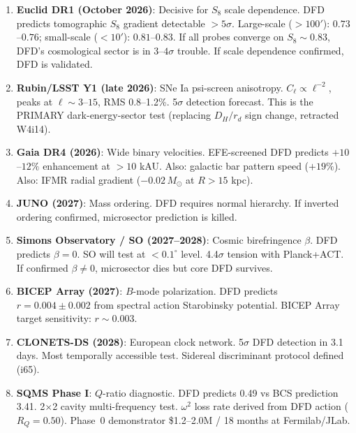 \documentclass[11pt,a4paper]{article}
\begin{document}
\begin{enumerate}
\item \textbf{Euclid DR1 (October 2026)}: Decisive for $S_8$ scale dependence. DFD predicts tomographic $S_8$ gradient detectable $>5\sigma$. Large-scale (${>}100'$): $0.73$--$0.76$; small-scale (${<}10'$): $0.81$--$0.83$. If all probes converge on $S_8 \sim 0.83$, DFD's cosmological sector is in $3$--$4\sigma$ trouble. If scale dependence confirmed, DFD is validated.

\item \textbf{Rubin/LSST Y1 (late 2026)}: SNe Ia psi-screen anisotropy. $C_\ell \propto \ell^{-2}$, peaks at $\ell \sim 3$--$15$, RMS 0.8--1.2\%. 5$\sigma$ detection forecast. This is the PRIMARY dark-energy-sector test (replacing $D_H/r_d$ sign change, retracted W4i14).

\item \textbf{Gaia DR4 (2026)}: Wide binary velocities. EFE-screened DFD predicts $+10$--$12\%$ enhancement at $>10$ kAU. Also: galactic bar pattern speed ($+19\%$). Also: IFMR radial gradient ($-0.02\,M_\odot$ at $R > 15$ kpc).

\item \textbf{JUNO (2027)}: Mass ordering. DFD requires normal hierarchy. If inverted ordering confirmed, microsector prediction is killed.

\item \textbf{Simons Observatory / SO (2027--2028)}: Cosmic birefringence $\beta$. DFD predicts $\beta = 0$. SO will test at $< 0.1^\circ$ level. 4.4$\sigma$ tension with Planck+ACT. If confirmed $\beta \neq 0$, microsector dies but core DFD survives.

\item \textbf{BICEP Array (2027)}: $B$-mode polarization. DFD predicts $r = 0.004 \pm 0.002$ from spectral action Starobinsky potential. BICEP Array target sensitivity: $r \sim 0.003$.

\item \textbf{CLONETS-DS (2028)}: European clock network. 5$\sigma$ DFD detection in 3.1 days. Most temporally accessible test. Sidereal discriminant protocol defined (i65).

\item \textbf{SQMS Phase I}: $Q$-ratio diagnostic. DFD predicts 0.49 vs BCS prediction 3.41. 2$\times$2 cavity multi-frequency test. $\omega^2$ loss rate derived from DFD action ($R_Q = 0.50$). Phase~0 demonstrator \$1.2--2.0M / 18 months at Fermilab/JLab.
\end{enumerate}
\end{document}
